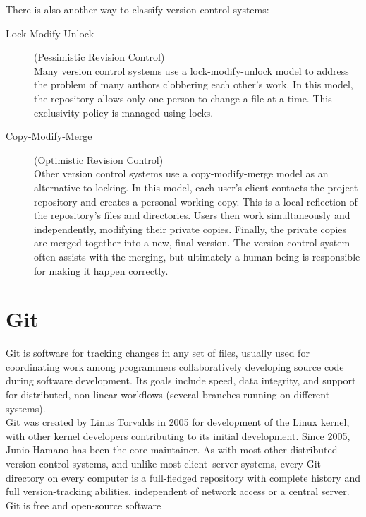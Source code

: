 There is also another way to classify version control systems:

\begin{description}
\item[Lock-Modify-Unlock] (Pessimistic Revision Control)\\
Many version control systems use a lock-modify-unlock model to
address the problem of many authors clobbering each other's work.
In this model, the repository allows only one person to change a
file at a time. This exclusivity policy is managed using locks.
\item[Copy-Modify-Merge] (Optimistic Revision Control)\\
Other version control systems use a copy-modify-merge model as an
alternative to locking. In this model, each user's client contacts the
project repository and creates a personal working copy. This is a local
reflection of the repository's files and directories.
Users then work simultaneously and independently, modifying their
private copies. Finally, the private copies are merged together into a
new, final version. The version control system often assists with
the merging, but ultimately a human being is responsible for making it
happen correctly.
\end{description}
\newslide
\newpage
\section{Git}
Git is software for tracking changes in any set of files,
usually used for coordinating work among programmers collaboratively
developing source code during software development. Its goals include
speed, data integrity, and support for distributed, non-linear workflows
(several branches running on different systems).\\

Git was created by Linus Torvalds in 2005 for development of the
Linux kernel, with other kernel developers contributing to its initial
development. Since 2005, Junio Hamano has been the core maintainer.
As with most other distributed version control systems, and unlike most
client–server systems, every Git directory on every computer is a
full-fledged repository with complete history and full version-tracking
abilities, independent of network access or a central server.
Git is free and open-source software


